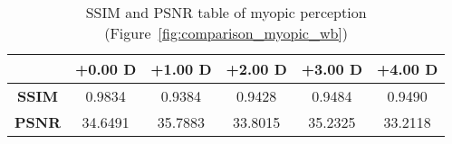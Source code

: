 
\begin{table}[!b]
	\centering
	\label{table:metrics_myopic_wb}
	\caption[SSIM and PSNR table of myopic perception (Figure~\ref{fig:comparison_myopic_wb})]{SSIM and PSNR table of myopic perception (Figure~\ref{fig:comparison_myopic_wb})}
	
	\begin{tabular}{cccccc}
	{\bf }                          & {\bf +0.00 D} & {\bf +1.00 D} & {\bf +2.00 D} & {\bf +3.00 D} & {\bf +4.00 D} \\ \hline
	\multicolumn{1}{c|}{{\bf SSIM}} & 0.9834  		& 0.9384  		& 0.9428  		& 0.9484  		& 0.9490  		\\
	\multicolumn{1}{c|}{{\bf PSNR}} & 34.6491 		& 35.7883 		& 33.8015 		& 35.2325 		& 33.2118
	\end{tabular}
\end{table}